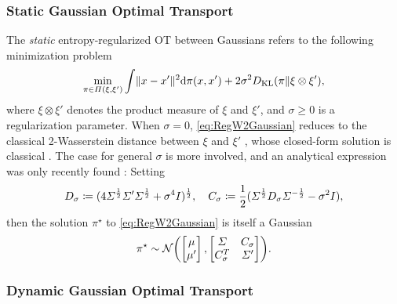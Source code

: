 \subsubsection{Static Gaussian Optimal Transport}
\label{sec:staticGOT}

The \emph{static} entropy-regularized \acrshort{OT} between Gaussians refers to the following minimization problem \citep{peyre2019computational}
\begin{equation}
\label{eq:RegW2Gaussian}
\min_{\pi \in \Pi(\xi, \xi')} \int  \lVert x-x'\rVert^2  \mathrm{d} \pi(x, x') + 2\sigma^2 D_{\mathrm{KL}}(\pi \| \xi \otimes \xi'),
\end{equation}where $\xi\otimes\xi'$ denotes the product measure of $\xi$ and $\xi'$, and $\sigma \geq 0$ is a regularization parameter. When $\sigma = 0$, \eqref{eq:RegW2Gaussian} reduces to the classical 2-Wasserstein distance between $\xi$ and $\xi'$ \citep{villani2009optimal}, whose closed-form solution is classical \citep{dowson1982frechet, olkin1982distance}. The case for general $\sigma$ is more involved, and an analytical expression was only recently found \citep{bojilov2016matching, del2020statistical, janati2020entropic, mallasto2021entropy}: Setting%
\begin{equation}
\label{eq:Cstar}
D_\sigma \coloneqq ( 4\Sigma^{\frac{1}{2}} \Sigma' \Sigma^{\frac{1}{2}} + \sigma^4I  )^{\frac{1}{2}},\quad C_\sigma \coloneqq \frac{1}{2}(\Sigma^{\frac{1}{2}} D_\sigma \Sigma^{-\frac{1}{2}} - \sigma^2I),
\end{equation}
then the solution $\pi^\star$ to \eqref{eq:RegW2Gaussian} is itself a Gaussian
\begin{align}
\label{eq:StaticGaussianSB-sol}
\pi^\star \sim \Ncal \parens*{  \begin{bmatrix}
\mu \\
\mu'
\end{bmatrix},  \begin{bmatrix}
\Sigma&C_\sigma\\
C_\sigma^T &\Sigma'
\end{bmatrix}}.
\end{align}

\subsubsection{Dynamic Gaussian Optimal Transport}
\label{sec:dynamicGOT-BB}

